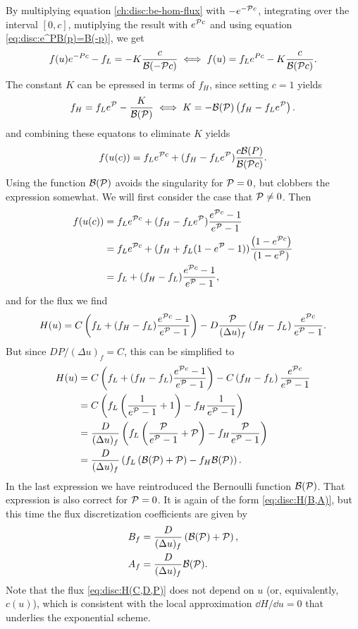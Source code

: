 \documentclass{book}
\newcommand{\Pe}[0]{{\ensuremath{{\cal P}}}}
\begin{document}
By multiplying equation \eqref{ch:disc:be-hom-flux} with $-e^{-\Pe c}$, integrating over
the interval $[0,c]$, mutiplying the result with $e^{\Pe c}$ and using equation
\eqref{eq:disc:e^PB(p)=B(-p)}, we get
\begin{equation}
	f(u)e^{-Pc} - f_L = - K \frac{c}{{\cal B}(-\Pe c)}
	\iff
	f(u) = f_Le^{Pc} - K \frac{c}{{\cal B}(\Pe c)}.
\end{equation}
The constant $K$ can be epressed in terms of $f_H$, since setting $c=1$ yields
\begin{equation}
	f_H = f_Le^{\Pe} -\frac{K}{{\cal B}(\Pe)}
	\iff
	K = - {\cal B}(\Pe)\left(f_H - f_Le^{\Pe}\right).
\end{equation}
and combining these equatons to eliminate $K$ yields
\begin{equation}
	f(u(c))
	= f_Le^{\Pe c} + (f_H - f_Le^{\Pe})\frac{c{\cal B}(P)}{{\cal B}(\Pe c)}.
\end{equation}
Using the function ${\cal B}(\Pe)$ avoids the singularity for $\Pe=0$, but clobbers
the expression somewhat. We will first consider the case that $\Pe\neq 0$. Then
\begin{align}
	f(u(c))
	&= f_Le^{\Pe c} + (f_H - f_Le^{\Pe})\frac{e^{\Pe c}-1}{e^\Pe-1} \nonumber \\
	&= f_Le^{\Pe c} + (f_H + f_L(1 - e^{\Pe}-1))\frac{\left(1-e^{\Pe c}\right)}{\left(1-e^{\Pe}\right)} \nonumber \\
	&= f_L + (f_H-f_L)\frac{e^{\Pe c}-1}{e^{\Pe}-1},
\end{align}
and for the flux we find
\begin{equation}
	H(u)
	= C\left(f_L + (f_H-f_L)\frac{e^{\Pe c}-1}{e^{\Pe}-1}\right)
	- D\frac{\Pe}{(\Delta u)_f}\left(f_H-f_L\right)\frac{e^{\Pe c}}{e^{\Pe}-1}.
	\label{eq:disc:H(C,D,P)}
\end{equation}
But since $DP/(\Delta u)_f=C$, this can be simplified to
\begin{align}
	H(u)
	&= C\left(f_L + (f_H-f_L)\frac{e^{\Pe c}-1}{e^{\Pe}-1}\right)
	- C\left(f_H-f_L\right)\frac{e^{\Pe c}}{e^{\Pe}-1}
	\nonumber \\
	&= C\left(f_L\left(\frac{1}{e^{\Pe}-1}+1\right) - f_H\frac{1}{e^{\Pe}-1}\right)
	\nonumber \\
	&= \frac{D}{(\Delta u)_f}\left(f_L\left(\frac{\Pe}{e^{\Pe}-1}+\Pe\right) - f_H\frac{\Pe}{e^{\Pe}-1}\right)
	\nonumber \\
	&= \frac{D}{(\Delta u)_f}\left(f_L\left({\cal B}(\Pe)+\Pe\right) - f_H{\cal B}(\Pe)\right).
\end{align}
In the last expression we have reintroduced the Bernoulli function ${\cal B}(\Pe)$. That expression
is also correct for $\Pe=0$. It is again of the form \eqref{eq:disc:H(B,A)}, but this time the
flux discretization coefficients are given by
\begin{align}
	B_f &= \frac{D}{(\Delta u)_f}\left({\cal B}(\Pe)+\Pe\right), \label{eq:disc:B_f-exp} \\
	A_f &= \frac{D}{(\Delta u)_f}{\cal B}(\Pe). \label{eq:disc:A_f-exp}
\end{align}
Note that the flux \eqref{eq:disc:H(C,D,P)} does not depend on $u$ (or, equivalently, $c(u)$),
which is consistent with the local approximation $\dd{H}/\dd{u}=0$ that underlies the exponential
scheme.
\end{document}
